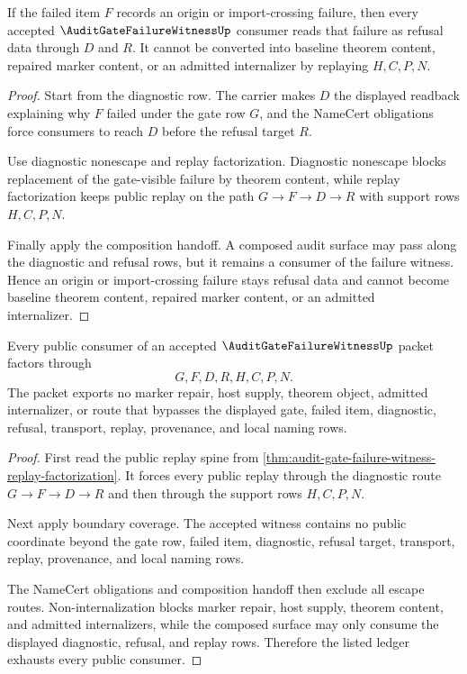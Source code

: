 \begin{theorem}
\label{thm:audit-gate-failure-witness-origin-refusal}
If the failed item $F$ records an origin or import-crossing failure, then every accepted $\AuditGateFailureWitnessUp$ consumer reads that failure as refusal data through $D$ and $R$. It cannot be converted into baseline theorem content, repaired marker content, or an admitted internalizer by replaying $H,C,P,N$.
\end{theorem}
\begin{proof}
Start from the diagnostic row. The carrier makes $D$ the displayed readback explaining why $F$ failed under the gate row $G$, and the NameCert obligations force consumers to reach $D$ before the refusal target $R$.

Use diagnostic nonescape and replay factorization. Diagnostic nonescape blocks replacement of the gate-visible failure by theorem content, while replay factorization keeps public replay on the path $G \to F \to D \to R$ with support rows $H,C,P,N$.

Finally apply the composition handoff. A composed audit surface may pass along the diagnostic and refusal rows, but it remains a consumer of the failure witness. Hence an origin or import-crossing failure stays refusal data and cannot become baseline theorem content, repaired marker content, or an admitted internalizer.
\end{proof}

\begin{theorem}
\label{thm:audit-gate-failure-witness-ledger-exhaustion}
Every public consumer of an accepted $\AuditGateFailureWitnessUp$ packet factors through
$$
G,F,D,R,H,C,P,N.
$$
The packet exports no marker repair, host supply, theorem object, admitted internalizer, or route that bypasses the displayed gate, failed item, diagnostic, refusal, transport, replay, provenance, and local naming rows.
\end{theorem}
\begin{proof}
First read the public replay spine from \autoref{thm:audit-gate-failure-witness-replay-factorization}. It forces every public replay through the diagnostic route $G \to F \to D \to R$ and then through the support rows $H,C,P,N$.

Next apply boundary coverage. The accepted witness contains no public coordinate beyond the gate row, failed item, diagnostic, refusal target, transport, replay, provenance, and local naming rows.

The NameCert obligations and composition handoff then exclude all escape routes. Non-internalization blocks marker repair, host supply, theorem content, and admitted internalizers, while the composed surface may only consume the displayed diagnostic, refusal, and replay rows. Therefore the listed ledger exhausts every public consumer.
\end{proof}

